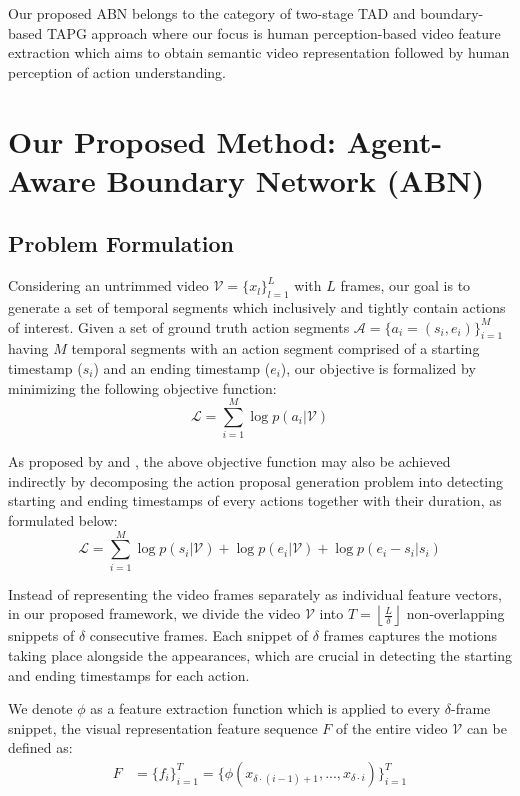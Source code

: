 \documentclass{ieeeaccess}
\begin{document}
Our proposed ABN belongs to the category of two-stage TAD and boundary-based TAPG approach where our focus is human perception-based video feature extraction which aims to obtain semantic video representation followed by human perception of action understanding. 

\section{Our Proposed Method: Agent-Aware Boundary Network (ABN)}

\subsection{Problem Formulation}
Considering an untrimmed video $\mathcal{V} = \{x_l\}^{L}_{l=1}$ with $L$ frames, our goal is to generate a set of temporal segments which inclusively and tightly contain actions of interest. Given a set of ground truth action segments $\mathcal{A} = \{a_i=(s_i, e_i)\}^{M}_{i=1}$ having $M$ temporal segments with an action segment comprised of a starting timestamp ($s_i$) and an ending timestamp ($e_i$), our objective is formalized by minimizing the following objective function:
\begin{equation}
\mathcal{L}=\sum\limits_{i=1}^M \log p(a_i|\mathcal{V})
\label{eq:objective}
\end{equation}

As proposed by \cite{lin2018bsn} and \cite{bmn}, the above objective function may also be achieved indirectly by decomposing the action proposal generation problem into detecting starting and ending timestamps of every actions together with their duration, as formulated below:
\begin{equation}
\mathcal{L}=\sum\limits_{i=1}^M \log p(s_i|\mathcal{V}) + \log p(e_i|\mathcal{V}) + \log p(e_i - s_i|s_i)
\label{eq:objective2}
\end{equation}



Instead of representing the video frames separately as individual feature vectors, in our proposed framework, we divide the video $\mathcal{V}$ into $T=\left \lfloor{\frac{L}{\delta}}\right\rfloor$ non-overlapping snippets of $\delta$ consecutive frames. Each snippet of $\delta$ frames captures the motions taking place alongside the appearances, which are crucial in detecting the starting and ending timestamps for each action.

We denote $\phi$ as a feature extraction function which is applied to every $\delta$-frame snippet, the visual representation feature sequence $F$ of the entire video $\mathcal{V}$ can be defined as:
\begin{equation}
\begin{split}
F & =\{f_i\}^{T}_{i=1} =\{\phi(x_{\delta\cdot(i-1)+1},...,x_{\delta\cdot i})\}^{T}_{i=1}
\label{eq:funF}
\end{split}
\end{equation}
\end{document}
